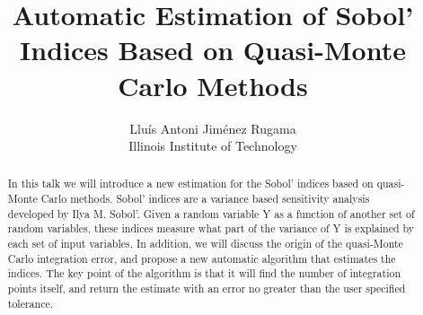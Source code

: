 \documentclass[]{elsarticle}
\theoremstyle{definition}
\begin{document}
\begin{frontmatter}

\title{Automatic Estimation of Sobol' Indices Based on Quasi-Monte Carlo Methods}
\author{Llu\'is Antoni Jim\'enez Rugama\\
Illinois Institute of Technology}
\begin{abstract}
In this talk we will introduce a new estimation for the Sobol' indices based on quasi-Monte Carlo methods. Sobol' indices are a variance based sensitivity analysis developed by Ilya M. Sobol'. Given a random variable Y as a function of another set of random variables, these indices measure what part of the variance of Y is explained by each set of input variables. In addition, we will discuss the origin of the quasi-Monte Carlo integration error, and propose a new automatic algorithm that estimates the indices. The key point of the algorithm is that it will find the number of integration points itself, and return the estimate with an error no greater than the user specified tolerance.

\end{abstract}

%

\end{frontmatter}


%

\end{document}
